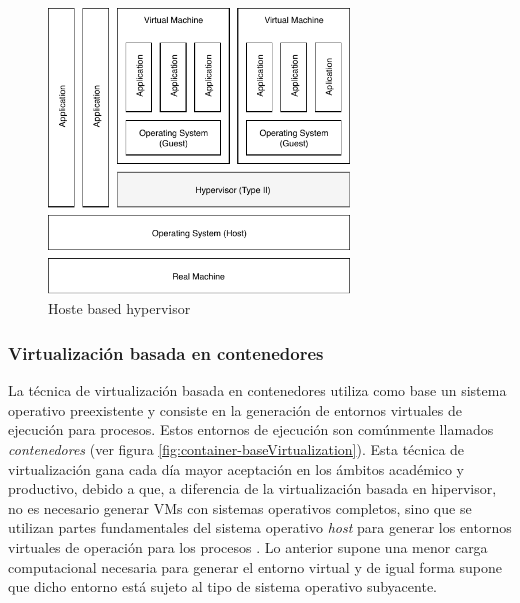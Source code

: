 \begin{figure}[ht] %
	\centering
	\includegraphics[width=8cm]{Pictures/host-basedHypervisor.pdf}
	\vspace{-0.2cm}
	\caption{Hoste based hypervisor}
	\label{fig:host-basedHypervisor}
\end{figure}

\subsubsection{Virtualización basada en contenedores}

La técnica de virtualización basada en contenedores utiliza como base un sistema operativo preexistente y consiste en la generación de entornos virtuales de ejecución para procesos. Estos entornos de ejecución son comúnmente llamados \textit{contenedores} (ver figura \ref{fig:container-baseVirtualization}). Esta técnica de virtualización gana cada día mayor aceptación en los ámbitos académico y productivo, debido a que, a diferencia de la virtualización basada en hipervisor, no es necesario generar VMs con sistemas operativos completos, sino que se utilizan partes fundamentales del sistema operativo \textit{host} para generar los entornos virtuales de operación para los procesos \parencite{Kon2017}. Lo anterior supone una menor carga computacional necesaria para generar el entorno virtual y de igual forma supone que dicho entorno está sujeto al tipo de sistema operativo subyacente. 



